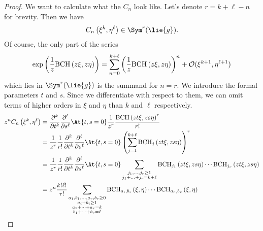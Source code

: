 \begin{proof}
	We want to calculate what the $C_n$ look like. Let's denote $r = k 
	+ \ell - n$ for brevity. Then we have
	\begin{equation*}
		C_n \left( \xi^k, \eta^{\ell} \right)
		\in \Sym^r(\lie{g}).
	\end{equation*}
	Of course, the only part of the series
	\begin{equation*}
		\exp\left(
			\frac{1}{z} \mathrm{BCH}\left(z \xi, z \eta\right)
		\right)
		=
		\sum\limits_{n = 0}^{k + \ell}
		\left(
			\frac{1}{z} \mathrm{BCH}\left(z \xi, z \eta\right)
		\right)^n
		+ \mathcal{O}(\xi^{k + 1}, \eta^{\ell + 1})
	\end{equation*} 
	which lies in $\Sym^r(\lie{g})$ is the summand for 
	$n = r $. We introduce the formal parameters $t$ and $s$.
	Since we differentiate with respect to them, we can omit 
	terms of higher orders in $\xi$ and $\eta$ than $k$ 
	and $\ell$ respectively.
    \begin{align*}
        z^n C_n \left( \xi^k, \eta^{\ell} \right)
        & =
        \frac{\partial^k}{\partial t^k}
        \frac{\partial^{\ell}}{\partial s^{\ell}}
        \At{t,s = 0}
        \frac{1}{z^r}
        \frac{\bch{z t \xi}{z s \eta}^r    }{r!}
        \\
        & =
        \frac{1}{z^r}
        \frac{1}{r!}
        \frac{\partial^k}{\partial t^k}
        \frac{\partial^{\ell}}{\partial s^{\ell}}
        \At{t,s = 0}
        \left(
            \sum\limits_{j = 1}^{k + \ell}
            \bchpart{j}{z t \xi}{z s \eta}
        \right)^r
        \\
        & =
        \frac{1}{z^r}
        \frac{1}{r!}
        \frac{\partial^k}{\partial t^k}
        \frac{\partial^{\ell}}{\partial s^{\ell}}
        \At{t,s = 0}
        \sum\limits_{\substack{
        	j_1, \ldots, j_r \geq 1 \\
            j_1 + \ldots + j_r = k + \ell
        }}
        \bchpart{j_1}{z t \xi}{z s \eta} 
        \cdots
        \bchpart{j_r}{z t \xi}{z s \eta}
        \\
        & =
        z^n
        \frac{k! \ell!}{r!}
        \sum\limits_{\substack{a_1, b_1, \ldots, a_r, b_r \geq 0 \\
            a_i + b_i \geq 1 \\
            a_1 + \cdots + a_r = k \\
            b_1 + \cdots + b_r = \ell
        }}
        \bchparts{a_i}{b_i}{\xi}{\eta}
        \cdots
        \bchparts{a_r}{b_r}{\xi}{\eta}
    \end{align*}

\end{proof}
